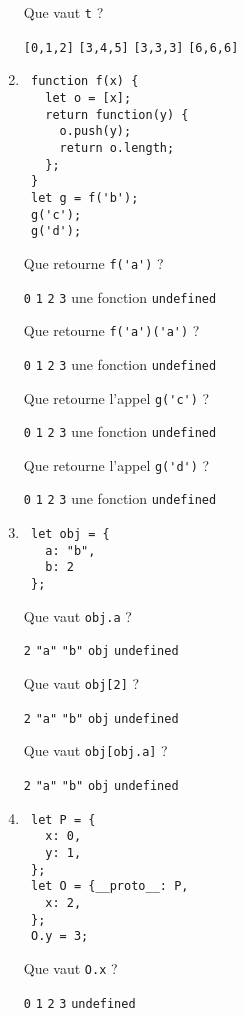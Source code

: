 \documentclass[a4paper, 12pt]{article}
\newcommand{\choice}[1]{\Square\hspace{2pt} #1\hspace{5pt}}
\newcommand{\choicec}[1]{\Square\hspace{2pt} \lstinline{#1}\hspace{5pt}}
\newcommand{\fullpoint}[1]{\textcolor{RubineRed}{#1}}
\newcommand{\choiceg}[1]{\fullpoint{\XBox\hspace{2pt} #1\hspace{5pt}}}
\newcommand{\choicecg}[1]{\fullpoint{\XBox\hspace{2pt} \lstinline{#1}\hspace{5pt}}}
\begin{document}
\begin{enumerate}
  Que vaut \lstinline{t} ?

  \choicec{[0,1,2]} \choicec{[3,4,5]} \choicec{[3,3,3]} \choicecg{[6,6,6]}

\item \lstset{language=javascript}
\begin{lstlisting}
 function f(x) {
   let o = [x];
   return function(y) {
     o.push(y);
     return o.length;
   };
 }
 let g = f('b');
 g('c');
 g('d');
\end{lstlisting}

  Que retourne \lstinline{f('a')} ?

  \choicec{0} \choicec{1} \choicec{2} \choicec{3} \choiceg{une fonction} \choicec{undefined}

  Que retourne \lstinline{f('a')('a')} ?

  \choicec{0} \choicec{1} \choicecg{2} \choicec{3} \choice{une fonction} \choicec{undefined}

  Que retourne l'appel \lstinline{g('c')} ?

  \choicec{0} \choicec{1} \choicecg{2} \choicec{3} \choice{une fonction} \choicec{undefined}

  Que retourne l'appel \lstinline{g('d')} ?

  \choicec{0} \choicec{1} \choicec{2} \choicecg{3} \choice{une fonction} \choicec{undefined}
\item \lstset{language=javascript}
\begin{lstlisting}
 let obj = {
   a: "b",
   b: 2
 };
\end{lstlisting}

  Que vaut \lstinline{obj.a} ?

  \choicec{2} \choicec{"a"} \choicecg{"b"} \choicec{obj} \choicec{undefined}

  Que vaut \lstinline{obj[2]} ?

  \choicec{2} \choicec{"a"} \choicec{"b"} \choicec{obj} \choicecg{undefined}

  Que vaut \lstinline{obj[obj.a]} ?

  \choicecg{2} \choicec{"a"} \choicec{"b"} \choicec{obj} \choicec{undefined}
\newpage
\item \begin{lstlisting}
 let P = {
   x: 0,
   y: 1,
 };
 let O = {__proto__: P,
   x: 2,
 };
 O.y = 3;
\end{lstlisting}

  Que vaut \lstinline{O.x} ?

  \choicec{0} \choicec{1} \choicecg{2} \choicec{3} \choicec{undefined}


\end{enumerate}
\end{document}

